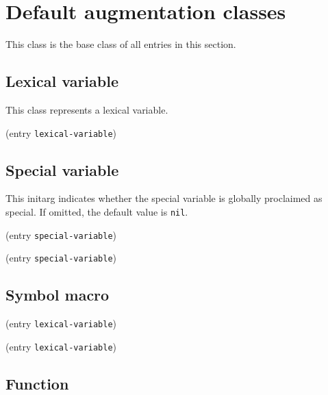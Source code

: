 \section{Default augmentation classes}


This class is the base class of all entries in this section.

\subsection {Lexical variable}


This class represents a lexical variable.


 {(entry {\tt lexical-variable})}

\subsection {Special variable}




This initarg indicates whether the special variable is globally
proclaimed as special.  If omitted, the default value is
\texttt{nil}. 

 {(entry {\tt special-variable})}

 {(entry {\tt special-variable})}

\subsection {Symbol macro}




 {(entry {\tt lexical-variable})}

 {(entry {\tt lexical-variable})}

\subsection {Function}


